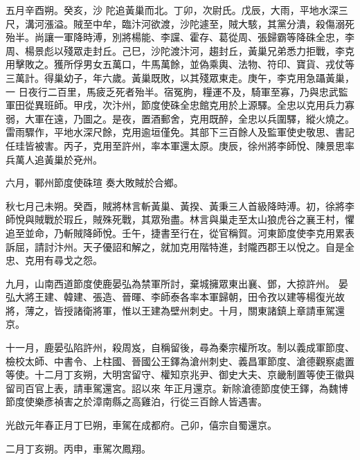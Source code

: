 \begin{pinyinscope}
 五月辛酉朔。癸亥，沙
 陀追黃巢而北。丁卯，次尉氏。戊辰，大雨，平地水深三尺，溝河漲溢。賊至中牟，臨汴河欲渡，沙陀遽至，賊大駭，其黨分潰，殺傷溺死殆半。尚讓一軍降時溥，別將楊能、李讜、霍存、葛從周、張歸霸等降硃全忠，李周、楊景彪以殘眾走封丘。己巳，沙陀渡汴河，趨封丘，黃巢兄弟悉力拒戰，李克用擊敗之。獲所俘男女五萬口，牛馬萬餘，並偽乘輿、法物、符印、寶貨、戎仗等三萬計。得巢幼子，年六歲。黃巢既敗，以其殘眾東走。庚午，李克用急躡黃巢，一
 日夜行二百里，馬疲乏死者殆半。宿冤朐，糧運不及，騎軍至寡，乃與忠武監軍田從異班師。甲戌，次汴州，節度使硃全忠館克用於上源驛。全忠以克用兵力寡弱，大軍在遠，乃圖之。是夜，置酒郵舍，克用既醉，全忠以兵圍驛，縱火燒之。雷雨驟作，平地水深尺餘，克用逾垣僅免。其部下三百餘人及監軍使史敬思、書記任珪皆被害。丙子，克用至許州，率本軍還太原。庚辰，徐州將李師悅、陳景思率兵萬人追黃巢於兗州。



 六月，鄆州節度使硃瑄
 奏大敗賊於合鄉。



 秋七月己未朔。癸酉，賊將林言斬黃巢、黃揆、黃秉三人首級降時溥。初，徐將李師悅與賊戰於瑕丘，賊殊死戰，其眾殆盡。林言與巢走至太山狼虎谷之襄王村，懼追至並命，乃斬賊降師悅。壬午，捷書至行在，從官稱賀。河東節度使李克用累表訴屈，請討汴州。天子優詔和解之，就加克用階特進，封隴西郡王以悅之。自是全忠、克用有尋戈之怨。



 九月，山南西道節度使鹿晏弘為禁軍所討，棄城擁眾東出襄、鄧，大掠許州。
 晏弘大將王建、韓建、張造、晉暉、李師泰各率本軍歸朝，田令孜以建等楊復光故將，薄之，皆授諸衛將軍，惟以王建為壁州刺史。十月，關東諸鎮上章請車駕還京。



 十一月，鹿晏弘陷許州，殺周岌，自稱留後，尋為秦宗權所攻。制以義成軍節度、檢校太師、中書令、上柱國、晉國公王鐸為滄州刺史、義昌軍節度、滄德觀察處置等使。十二月丁亥朔，大明宮留守、權知京兆尹、御史大夫、京畿制置等使王徽與留司百官上表，請車駕還宮。詔以來
 年正月還京。新除滄德節度使王鐸，為魏博節度使樂彥禎害之於漳南縣之高雞泊，行從三百餘人皆遇害。



 光啟元年春正月丁巳朔，車駕在成都府。己卯，僖宗自蜀還京。



 二月丁亥朔。丙申，車駕次鳳翔。




\end{pinyinscope}
